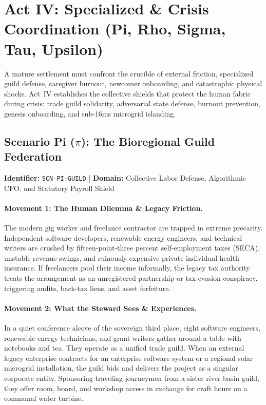 \section{Act IV: Specialized \& Crisis Coordination (Pi, Rho, Sigma, Tau, Upsilon)}
\label{sec:act_4_care}

A mature settlement must confront the crucible of external friction, specialized guild defense, caregiver burnout, newcomer onboarding, and catastrophic physical shocks. Act~IV establishes the collective shields that protect the human fabric during crisis: trade guild solidarity, adversarial state defense, burnout prevention, genesis onboarding, and sub-16ms microgrid islanding.

\subsection{Scenario Pi (\texorpdfstring{$\pi$}{Pi}): The Bioregional Guild Federation}
\label{subsec:scn_pi}
\textbf{Identifier:} \texttt{SCN-PI-GUILD} \quad | \quad \textbf{Domain:} Collective Labor Defense, Algorithmic CFO, and Statutory Payroll Shield

\paragraph{Movement 1: The Human Dilemma \& Legacy Friction.}
The modern gig worker and freelance contractor are trapped in extreme precarity. Independent software developers, renewable energy engineers, and technical writers are crushed by fifteen-point-three percent self-employment taxes (SECA), unstable revenue swings, and ruinously expensive private individual health insurance. If freelancers pool their income informally, the legacy tax authority treats the arrangement as an unregistered partnership or tax evasion conspiracy, triggering audits, back-tax liens, and asset forfeiture.

\paragraph{Movement 2: What the Steward Sees \& Experiences.}
In a quiet conference alcove of the sovereign third place, eight software engineers, renewable energy technicians, and grant writers gather around a table with notebooks and tea. They operate as a unified trade guild. When an external legacy enterprise contracts for an enterprise software system or a regional solar microgrid installation, the guild bids and delivers the project as a singular corporate entity. Sponsoring traveling journeymen from a sister river basin guild, they offer room, board, and workshop access in exchange for craft hours on a communal water turbine.

